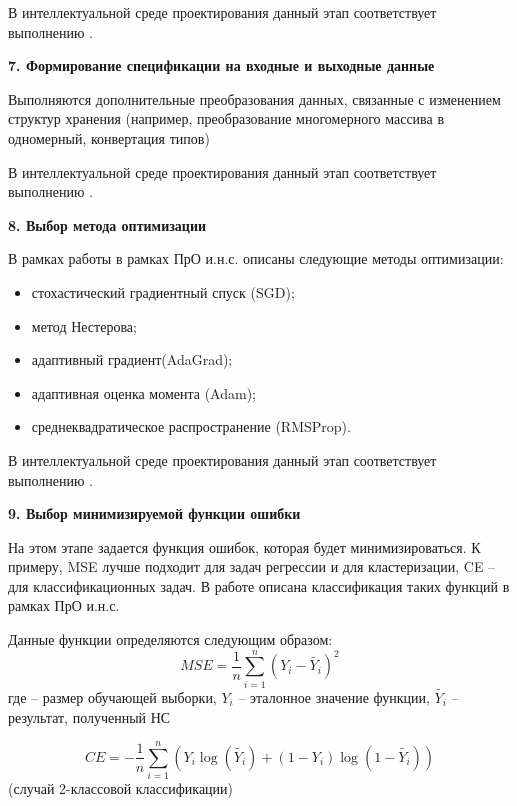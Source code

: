 В интеллектуальной среде проектирования данный этап соответствует выполнению .


\textbf{7. Формирование спецификации на входные и выходные данные}

Выполняются дополнительные преобразования данных, связанные с изменением структур хранения (например, преобразование многомерного массива в одномерный, конвертация типов)

В интеллектуальной среде проектирования данный этап соответствует выполнению .


\textbf{8. Выбор метода оптимизации }

В рамках работы  в рамках ПрО и.н.с. описаны следующие методы оптимизации:
\begin{itemize}
	\item стохастический градиентный спуск (SGD);
	\item метод Нестерова;
	\item адаптивный градиент(AdaGrad);
	\item адаптивная оценка момента (Adam);
	\item среднеквадратическое распространение (RMSProp).
\end{itemize}

В интеллектуальной среде проектирования данный этап соответствует выполнению .


\textbf{9. Выбор минимизируемой функции ошибки}

На этом этапе задается функция ошибок, которая будет минимизироваться. К примеру, MSE лучше подходит для задач регрессии и для кластеризации, CE -- для классификационных задач.
В работе  описана классификация таких функций в рамках ПрО и.н.с.

Данные функции определяются следующим образом:
\begin{equation*}
	MSE = \frac{1}{n} \sum_{i=1}^n (Y_i - \widetilde{Y_i})^2
\end{equation*}
где  -- размер обучающей выборки, $Y_i$ -- эталонное значение функции, $\widetilde{Y_i}$ -- результат, полученный НС

\begin{equation*}
	CE = - \frac{1}{n} \sum_{i=1}^n (Y_i\log(\widetilde{Y_i}) + (1-Y_i)\log(1 - \widetilde{Y_i}))
\end{equation*}
(случай 2-классовой классификации)

